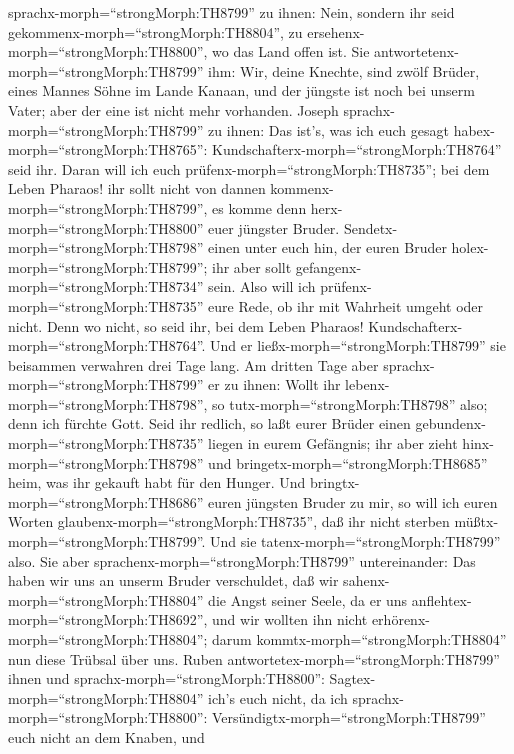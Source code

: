 sprachx-morph=``strongMorph:TH8799'' zu ihnen: Nein, sondern ihr seid
gekommenx-morph=``strongMorph:TH8804'', zu
ersehenx-morph=``strongMorph:TH8800'', wo das Land offen ist.
 Sie antwortetenx-morph=``strongMorph:TH8799'' ihm: Wir,
deine Knechte, sind zwölf Brüder, eines Mannes Söhne im Lande Kanaan,
und der jüngste ist noch bei unserm Vater; aber der eine ist nicht mehr
vorhanden.  Joseph sprachx-morph=``strongMorph:TH8799'' zu
ihnen: Das ist's, was ich euch gesagt
habex-morph=``strongMorph:TH8765'':
Kundschafterx-morph=``strongMorph:TH8764'' seid ihr.  Daran
will ich euch prüfenx-morph=``strongMorph:TH8735''; bei dem Leben
Pharaos! ihr sollt nicht von dannen
kommenx-morph=``strongMorph:TH8799'', es komme denn
herx-morph=``strongMorph:TH8800'' euer jüngster Bruder. 
Sendetx-morph=``strongMorph:TH8798'' einen unter euch hin, der euren
Bruder holex-morph=``strongMorph:TH8799''; ihr aber sollt
gefangenx-morph=``strongMorph:TH8734'' sein. Also will ich
prüfenx-morph=``strongMorph:TH8735'' eure Rede, ob ihr mit Wahrheit
umgeht oder nicht. Denn wo nicht, so seid ihr, bei dem Leben Pharaos!
Kundschafterx-morph=``strongMorph:TH8764''.  Und er
ließx-morph=``strongMorph:TH8799'' sie beisammen verwahren drei Tage
lang.  Am dritten Tage aber
sprachx-morph=``strongMorph:TH8799'' er zu ihnen: Wollt ihr
lebenx-morph=``strongMorph:TH8798'', so
tutx-morph=``strongMorph:TH8798'' also; denn ich fürchte Gott.
 Seid ihr redlich, so laßt eurer Brüder einen
gebundenx-morph=``strongMorph:TH8735'' liegen in eurem Gefängnis; ihr
aber zieht hinx-morph=``strongMorph:TH8798'' und
bringetx-morph=``strongMorph:TH8685'' heim, was ihr gekauft habt für den
Hunger.  Und bringtx-morph=``strongMorph:TH8686'' euren
jüngsten Bruder zu mir, so will ich euren Worten
glaubenx-morph=``strongMorph:TH8735'', daß ihr nicht sterben
müßtx-morph=``strongMorph:TH8799''. Und sie
tatenx-morph=``strongMorph:TH8799'' also.  Sie aber
sprachenx-morph=``strongMorph:TH8799'' untereinander: Das haben wir uns
an unserm Bruder verschuldet, daß wir
sahenx-morph=``strongMorph:TH8804'' die Angst seiner Seele, da er uns
anflehtex-morph=``strongMorph:TH8692'', und wir wollten ihn nicht
erhörenx-morph=``strongMorph:TH8804''; darum
kommtx-morph=``strongMorph:TH8804'' nun diese Trübsal über uns.
 Ruben antwortetex-morph=``strongMorph:TH8799'' ihnen und
sprachx-morph=``strongMorph:TH8800'':
Sagtex-morph=``strongMorph:TH8804'' ich's euch nicht, da ich
sprachx-morph=``strongMorph:TH8800'':
Versündigtx-morph=``strongMorph:TH8799'' euch nicht an dem Knaben, und
